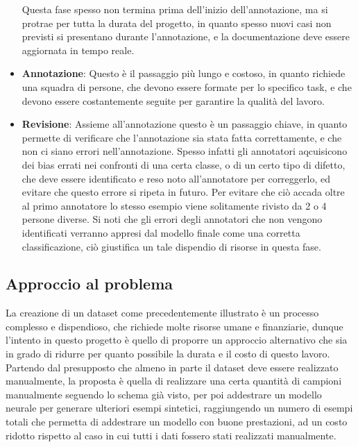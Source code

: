 \begin{itemize}
        Questa fase spesso non termina prima dell'inizio dell'annotazione, ma si protrae per tutta la durata del progetto, in quanto
        spesso nuovi casi non previsti si presentano durante l'annotazione, e la documentazione deve essere aggiornata in tempo reale.
    \item \textbf{Annotazione}: Questo è il passaggio più lungo e costoso, in quanto richiede una squadra di persone,
        che devono essere formate per lo specifico task, e che devono essere costantemente seguite per garantire la qualità del lavoro.
    \item \textbf{Revisione}: Assieme all'annotazione questo è un passaggio chiave, in quanto permette di verificare che l'annotazione sia stata fatta correttamente,
        e che non ci siano errori nell'annotazione. Spesso infatti gli annotatori aqcuisicono dei bias errati nei confronti di una certa classe, o di un certo tipo di difetto, 
        che deve essere identificato e reso noto all'annotatore per correggerlo, ed evitare che questo errore si ripeta in futuro.
        Per evitare che ciò accada oltre al primo annotatore lo stesso esempio viene solitamente rivisto da 2 o 4 persone diverse.
        Si noti che gli errori degli annotatori che non vengono identificati verranno appresi dal modello finale come una corretta classificazione, ciò giustifica un tale 
        dispendio di risorse in questa fase.
\end{itemize}

\subsection{Approccio al problema \ok}

La creazione di un dataset come precedentemente illustrato è un processo complesso e dispendioso, che richiede molte risorse umane e finanziarie,
dunque l'intento in questo progetto è quello di proporre un approccio alternativo che sia in grado di ridurre per quanto possibile la durata e il costo
di questo lavoro.
Partendo dal presupposto che almeno in parte il dataset deve essere realizzato manualmente, la proposta è quella di realizzare una certa 
quantità di campioni manualmente seguendo lo schema già visto, per poi addestrare un modello neurale per generare ulteriori esempi sintetici,
raggiungendo un numero di esempi totali che permetta di addestrare un modello con buone prestazioni, ad un costo ridotto rispetto al caso in cui
tutti i dati fossero stati realizzati manualmente.

